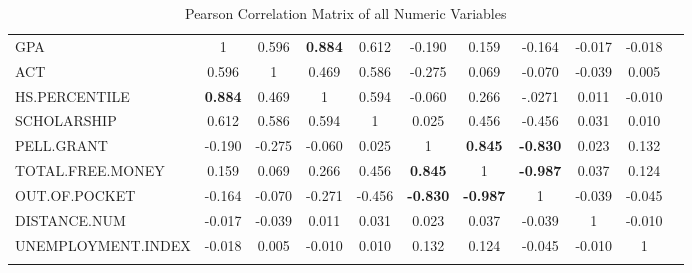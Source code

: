\documentclass[12pt,english]{report}
\begin{document}
\begin{table}
{\begin{tabular}{@{\extracolsep{4pt}} lcccccccccc}
GPA         & 1       & 0.596  & \textbf{0.884}
& 0.612                 & -0.190
& 0.159             & -0.164
& -0.017            & -0.018 \\
ACT                & 0.596          & 1      & 0.469
& 0.586            & -0.275
& 0.069                    & -0.070
& -0.039             & 0.005\\
HS.PERCENTILE      & \textbf{0.884} & 0.469  & 1
& 0.594                                                   & -0.060
& 0.266                                                       & -.0271
& 0.011                                                   & -0.010\\
SCHOLARSHIP        & 0.612          & 0.586  & 0.594
& 1                                                       & 0.025
& 0.456                             & -0.456
& 0.031                                                   & 0.010\\
PELL.GRANT         & -0.190         & -0.275 & -0.060
& 0.025                                                   & 1
& \textbf{0.845}         & \textbf{-0.830}
& 0.023       & 0.132\\
TOTAL.FREE.MONEY   & 0.159          & 0.069  & 0.266
& 0.456           & \textbf{0.845}
& 1          & \textbf{-0.987}
& 0.037                                                   & 0.124\\
OUT.OF.POCKET      & -0.164         & -0.070 & -0.271
& -0.456         & \textbf{-0.830}
& \textbf{-0.987}                                             & 1
& -0.039                                                  & -0.045\\
DISTANCE.NUM       & -0.017         & -0.039 & 0.011
& 0.031        & 0.023
& 0.037            & -0.039
& 1                                                       & -0.010\\
UNEMPLOYMENT.INDEX & -0.018         & 0.005  & -0.010
& 0.010                                                   & 0.132
& 0.124          & -0.045
& -0.010         & 1 \\
\hline \\[-1.8ex]                                                            
\end{tabular}}
\caption{Pearson Correlation Matrix of all Numeric Variables} 
  \label{correlation_matrix} 
\end{table}
\end{document}
